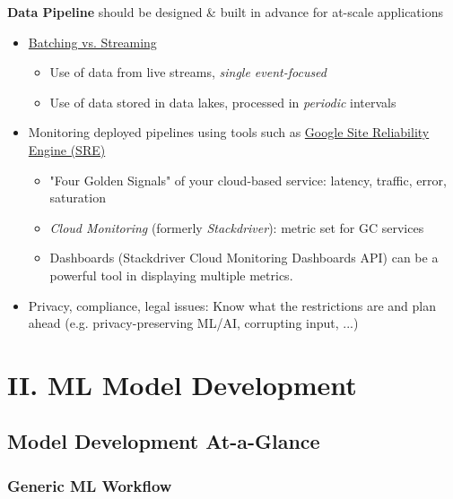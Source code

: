 \documentclass[10pt,landscape,letterpaper]{cheatsheet}
\begin{document}
\begin{multicols}{3}
\textbf{Data Pipeline} should be designed \& built in advance for at-scale applications

\begin{itemize}
    \item \href{https://medium.com/simpl-under-the-hood/data-pipeline-batch-vs-stream-processing-d038bdb29e18}{Batching vs. Streaming}
        \begin{itemize}
            \item Use of data from live streams, \textit{single event-focused}
            \item Use of data stored in data lakes, processed in \textit{periodic} intervals
        \end{itemize}
    \item Monitoring deployed pipelines using tools such as \href{https://cloud.google.com/blog/products/management-tools/the-right-metrics-to-monitor-cloud-data-pipelines}{Google Site Reliability Engine (SRE)}
    \begin{itemize}
        \item "Four Golden Signals" of your cloud-based service: latency, traffic, error, saturation
        \item \emph{Cloud Monitoring} (formerly \emph{Stackdriver}): metric set for GC services
        \item Dashboards (Stackdriver Cloud Monitoring Dashboards API) can be a powerful tool in displaying multiple metrics.
    \end{itemize}
    \item Privacy, compliance, legal issues: Know what the restrictions are and plan ahead (e.g. privacy-preserving ML/AI, corrupting input, ...)
\end{itemize}

\section{II. ML Model Development}

\subsection{Model Development At-a-Glance}

\subsubsection{Generic ML Workflow}


\end{multicols}
\end{document}
